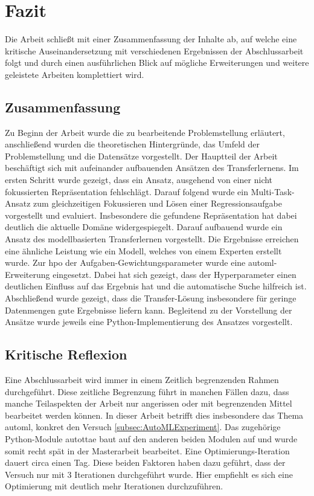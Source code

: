 \chapter{Fazit}
\label{chap:Fazit}
Die Arbeit schließt mit einer Zusammenfassung der Inhalte ab, auf welche eine kritische Auseinandersetzung mit verschiedenen Ergebnissen der Abschlussarbeit folgt und durch einen ausführlichen Blick auf mögliche Erweiterungen und weitere geleistete Arbeiten komplettiert wird.
 
	\section{Zusammenfassung}
	\label{sec:Zusammenfassung}
	Zu Beginn der Arbeit wurde die zu bearbeitende Problemstellung erläutert, anschließend wurden die theoretischen Hintergründe, das Umfeld der Problemstellung und die Datensätze vorgestellt. Der Hauptteil der Arbeit beschäftigt sich mit aufeinander aufbauenden Ansätzen des Transferlernens. Im ersten Schritt wurde gezeigt, dass ein Ansatz, ausgehend von einer nicht fokussierten Repräsentation fehlschlägt. Darauf folgend wurde ein Multi-Task-Ansatz zum gleichzeitigen Fokussieren und Lösen einer Regressionsaufgabe vorgestellt und evaluiert. Insbesondere die gefundene Repräsentation hat dabei deutlich die aktuelle Domäne widergespiegelt. Darauf aufbauend wurde ein Ansatz des modellbasierten Transferlernen vorgestellt. Die Ergebnisse erreichen eine ähnliche Leistung wie ein Modell, welches von einem Experten erstellt wurde. Zur \ac{hpo} der Aufgaben-Gewichtungsparameter wurde eine \ac{automl}-Erweiterung eingesetzt. Dabei hat sich gezeigt, dass der Hyperparameter einen deutlichen Einfluss auf das Ergebnis hat und die automatische Suche hilfreich ist. Abschließend wurde gezeigt, dass die Transfer-Lösung insbesondere für geringe Datenmengen gute Ergebnisse liefern kann. Begleitend zu der Vorstellung der Ansätze wurde jeweils eine Python-Implementierung des Ansatzes vorgestellt. 
	
	\section{Kritische Reflexion}
	\label{sec:KritischeReflexion}
	Eine  Abschlussarbeit wird immer in einem Zeitlich begrenzenden Rahmen durchgeführt. Diese zeitliche Begrenzung führt in manchen Fällen dazu, dass manche Teilaspekten der Arbeit nur angerissen oder mit  begrenzenden Mittel bearbeitet werden können. In dieser Arbeit betrifft dies insbesondere das Thema \ac{automl}, konkret den Versuch \ref{subsec:AutoMLExperiment}. Das zugehörige Python-Module \ac{autottae} baut auf den anderen beiden Modulen auf und wurde somit recht spät in der Masterarbeit bearbeitet. Eine Optimierungs-Iteration dauert circa einen Tag. Diese beiden Faktoren haben dazu geführt, dass der Versuch nur mit 3 Iterationen durchgeführt wurde. Hier empfiehlt es sich eine Optimierung mit deutlich mehr Iterationen durchzuführen.
	
